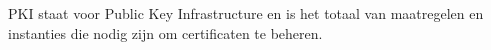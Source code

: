 PKI staat voor Public Key Infrastructure en is het totaal van maatregelen en instanties die nodig zijn om certificaten te beheren.
